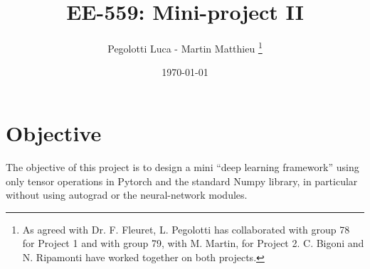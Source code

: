 \documentclass[10pt,final,a4paper]{article}
\begin{document}
\title{EE-559: Mini-project II}
\author{Pegolotti Luca - Martin Matthieu \footnote{As agreed with Dr. F. Fleuret, L. Pegolotti has collaborated with group 78 for Project 1 and with group 79, with M. Martin, for Project 2. C. Bigoni and N. Ripamonti have worked together on both projects.}}

\date{\today}
\maketitle


\section{Objective}

The objective of this project is to design a mini “deep learning framework” using only tensor operations in Pytorch and the standard Numpy library, in particular without using autograd or the neural-network modules. 
\end{document}
